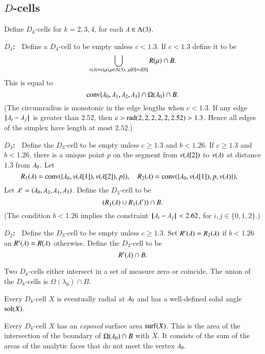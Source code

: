 \subsection{$D$-cells}

Define $D_k$-cells for $k=2,3,4$, for each $\lambda\in\Lambda(3)$.

{\bf $D_4$:~}  Define a $D_4$-cell to be empty unless $c<1.3$.  If $c<1.3$ define it to be
  $$
  \bigcup_{v(\lambda)=v(\mu), \mu\in \Lambda(3),\ \mu[0]=\lambda[0]}  R(\mu)\cap B.
$$
This is equal to
$$
{\operatorname{conv}}\{\lambda_0,\lambda_1,\lambda_2,\lambda_3\} \cap \Omega(\lambda_0)\cap B.
$$
(The circumradius is monotonic in the edge lengths when $c<1.3$.
If any edge ${\hskip0.1em|\hskip-0.15em|\hskip0.1em}\lambda_i - \lambda_j{\hskip0.1em|\hskip-0.15em|\hskip0.1em}$ is greater than $2.52$, then
$c > {\operatorname{rad}}(2,2,2,2,2,2.52) > 1.3$.  Hence all edges of the simplex have length at most $2.52$.)

{\bf $D_3$:~} Define the $D_3$-cell to be empty unless $c\ge 1.3$ and $b< 1.26$.  If $c \ge 1.3$ and $b< 1.26$, there is a unique point $p$
on the segment from $v(\lambda[2])$ to $v(\lambda)$ at distance $1.3$ from $\lambda_0$.  Let 
$$
R_1(\lambda) = {\operatorname{conv}}(\{\lambda_0,v(\lambda[1]),v(\lambda[2]),p\} ),\quad
R_2(\lambda) = {\operatorname{conv}}(\{\lambda_0,v(\lambda[1]),p,v(\lambda)\} ),\quad
$$
Let $\lambda' = (\lambda_0,\lambda_2,\lambda_1,\lambda_3)$.
Define the $D_3$-cell to be
$$
(R_1(\lambda) \cup R_1(\lambda'))\cap B.
$$
(The condition $b< 1.26$ implies the constraint ${\hskip0.1em|\hskip-0.15em|\hskip0.1em}\lambda_i - \lambda_j{\hskip0.1em|\hskip-0.15em|\hskip0.1em}< 2.62$, for $i,j\in\{0,1,2\}$.)

{\bf $D_2$:~} Define the $D_3$-cell to be empty unless $c\ge 1.3$.
Set $R'(\lambda) = R_2(\lambda)$ if $b< 1.26$ an $R'(\lambda) = R(\lambda)$
otherwise.  Define the $D_3$-cell to be
$$
R'(\lambda) \cap B.
$$

\begin{lemma}  Two $D_k$-cells either intersect in a set of measure zero or coincide.  The union of the $D_k$-cells is $\Omega(\lambda_0)\cap B$.
\end{lemma}

Every $D_k$-cell $X$ is eventually radial at $\lambda_0$ and has
a well-defined solid angle $\operatorname{sol}(X)$.

Every $D_k$-cell $X$ has an {\it exposed} surface area ${\operatorname{surf}}(X)$.
This is the area of the intersection of the boundary of 
$\Omega(\lambda_0)\cap B$ with $X$.  It consists of the sum of the
areas of the analytic faces that do not meet the vertex $\lambda_0$.

